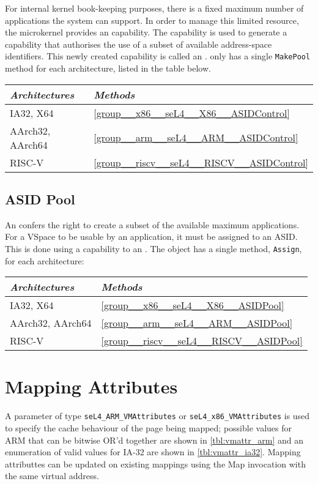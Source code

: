 For internal kernel book-keeping purposes, there is a fixed maximum
number of applications the system can support.  In order to manage
this limited resource, the microkernel provides an 
capability. The  capability is used to generate a
capability that authorises the use of a subset of available address-space identifiers.
This newly created capability is called an
.  only has a single \texttt{MakePool} method for each
architecture, listed in the table below.

\begin{tabularx}{\textwidth}{Xl} \toprule
\emph{Architectures} & \emph{Methods} \\ \midrule
IA32, X64            & \autoref{group__x86__seL4__X86__ASIDControl} \\
AArch32, AArch64     & \autoref{group__arm__seL4__ARM__ASIDControl} \\
RISC-V               & \autoref{group__riscv__seL4__RISCV__ASIDControl} \\
\bottomrule
\end{tabularx}

\subsection{ASID Pool}

An  confers the right to create a subset of the available
maximum applications. For a VSpace to be usable by an application, it
must be assigned to an ASID. This is done using a capability to an
. The  object has a single method, \texttt{Assign}, for each
architecture:

\begin{tabularx}{\textwidth}{Xl} \toprule
\emph{Architectures} & \emph{Methods} \\ \midrule
IA32, X64            & \autoref{group__x86__seL4__X86__ASIDPool} \\
AArch32, AArch64     & \autoref{group__arm__seL4__ARM__ASIDPool} \\
RISC-V               & \autoref{group__riscv__seL4__RISCV__ASIDPool} \\
\bottomrule
\end{tabularx}

\section{Mapping Attributes}
A parameter of type \texttt{seL4\_ARM\_VMAttributes} or
\texttt{seL4\_x86\_VMAttributes} is used to specify the cache behaviour of the
page being mapped; possible values for ARM that can be bitwise OR'd together are
shown in \autoref{tbl:vmattr_arm} \ifxeightsix and an enumeration of valid values
for IA-32 are shown in \autoref{tbl:vmattr_ia32}\fi. Mapping attributtes can be updated on existing mappings using the Map invocation with the same virtual address.

